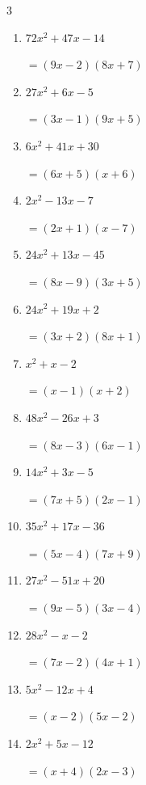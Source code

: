 \begin{multicols}{3}
\begin{enumerate}
        $=(x+3)(5x+1)$

\columnbreak %

\resetques

  \item $72x^{2}+47x-14$

        $=(9x-2)(8x+7)$

  \item $27x^{2}+6x-5$

        $=(3x-1)(9x+5)$

  \item $6x^{2}+41x+30$

        $=(6x+5)(x+6)$

  \item $2x^{2}-13x-7$

        $=(2x+1)(x-7)$

  \item $24x^{2}+13x-45$

        $=(8x-9)(3x+5)$

  \item $24x^{2}+19x+2$

        $=(3x+2)(8x+1)$

  \item $x^{2}+x-2$

        $=(x-1)(x+2)$

  \item $48x^{2}-26x+3$

        $=(8x-3)(6x-1)$

  \item $14x^{2}+3x-5$

        $=(7x+5)(2x-1)$

  \item $35x^{2}+17x-36$

        $=(5x-4)(7x+9)$

\columnbreak %

  \item $27x^{2}-51x+20$

        $=(9x-5)(3x-4)$

  \item $28x^{2}-x-2$

        $=(7x-2)(4x+1)$

  \item $5x^{2}-12x+4$

        $=(x-2)(5x-2)$

  \item $2x^{2}+5x-12$

        $=(x+4)(2x-3)$


\end{enumerate}
\end{multicols}
